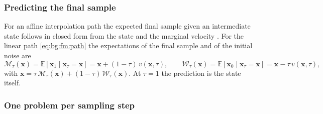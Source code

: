 \documentclass[headsepline,footsepline,footinclude=false,oneside,fontsize=11pt,paper=a4,listof=totoc,bibliography=totoc]{scrbook}
\theoremstyle{definition}
\theoremstyle{plain}
\theoremstyle{remark}
\newcommand{\vect}[1]{\boldsymbol{#1}}
\newcommand{\E}{\mathbb{E}}                    %
\newcommand{\vfield}{v}                        %
\newcommand{\ftime}{\tau}                      %
\begin{document}
\subsubsection*{Predicting the final sample}

For an affine interpolation path the expected final sample given an intermediate state follows in
closed form from the state and the marginal velocity \parencite[Lemma~1]{li2025hardflow}. For the linear
path \eqref{eq:bg:fm:path} the expectations of the final sample and of the initial noise are
\begin{equation}\label{eq:method:hf:post}
  \mathcal{M}_{\ftime}(\vect{x}) = \E\!\left[\vect{x}_{1}\mid\vect{x}_{\ftime}=\vect{x}\right]
    = \vect{x} + (1-\ftime)\,\vfield(\vect{x},\ftime),
  \qquad
  \mathcal{W}_{\ftime}(\vect{x}) = \E\!\left[\vect{x}_{0}\mid\vect{x}_{\ftime}=\vect{x}\right]
    = \vect{x} - \ftime\,\vfield(\vect{x},\ftime),
\end{equation}
with $\vect{x} = \ftime\,\mathcal{M}_{\ftime}(\vect{x}) + (1-\ftime)\,\mathcal{W}_{\ftime}(\vect{x})$.
At $\ftime=1$ the prediction is the state itself.

\subsubsection*{One problem per sampling step}
\end{document}
